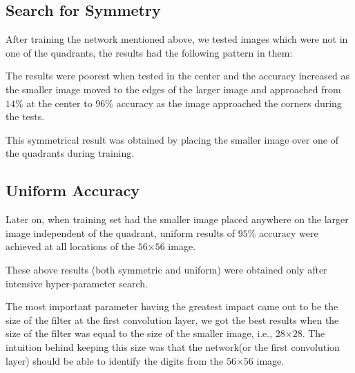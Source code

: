 \documentclass[12pt]{acmart}
\begin{document}
\subsection{Search for Symmetry}
After training the network mentioned above, we tested images which were not in one of the quadrants, the results had the following pattern in them:

The results were poorest when tested in the center and the accuracy increased as the smaller image moved to the edges of the larger image and approached from $14\%$ at the center to $96\%$ accuracy as the image approached the corners during the tests.

This symmetrical result was obtained by placing the smaller image over one of the quadrants during training.

\subsection{Uniform Accuracy}
Later on, when training set had the smaller image placed anywhere on the larger image independent of the quadrant, uniform results of $95\%$ accuracy were achieved at all locations of the $56$$\times$$56$ image.

These above results (both symmetric and uniform) were obtained only after intensive hyper-parameter search.

The most important parameter having the greatest impact came out to be the size of the filter at the first convolution layer, we got the best results when the size of the filter was equal to the size of the smaller image, i.e., $28$$\times$$28$.
The intuition behind keeping this size was that the network(or the first convolution layer) should be able to identify the digits from the $56$$\times$$56$ image.
\end{document}
